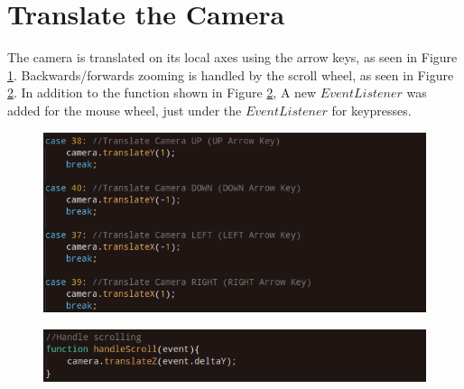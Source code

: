 \documentclass[12pt]{article}
\begin{document}
\section{Translate the Camera}
The camera is translated on its local axes using the arrow keys, as seen in Figure \ref{fig:7}. Backwards/forwards zooming is handled by
the scroll wheel, as seen in Figure \ref{fig:8}. In addition to the function shown in Figure \ref{fig:8}, A new $EventListener$ was added for the mouse wheel, just under the $EventListener$ for keypresses.
\begin{figure}[H]  
  \centering
  \includegraphics[width=\textwidth]{6.png}
  \caption{}
  \label{fig:7}
\end{figure}
\begin{figure}[H]  
  \centering
  \includegraphics[width=\textwidth]{7.png}
  \caption{}
  \label{fig:8}
\end{figure}
\end{document}
